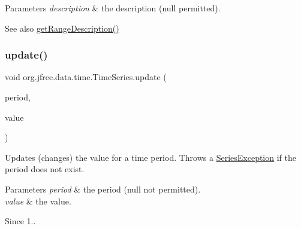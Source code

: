 \begin{DoxyParams}{Parameters}
{\em description} & the description ({\ttfamily null} permitted).\\
\hline
\end{DoxyParams}
\begin{DoxySeeAlso}{See also}
\mbox{\hyperlink{classorg_1_1jfree_1_1data_1_1time_1_1_time_series_a9a904357e8aef246ccadba5165add5e1}{get\+Range\+Description()}} 
\end{DoxySeeAlso}
\mbox{\label{classorg_1_1jfree_1_1data_1_1time_1_1_time_series_a0aec4775d79a7a21b0fd506041541c67}} 
\subsubsection{\texorpdfstring{update()}{update()}\hspace{0.1cm}{\footnotesize\ttfamily [1/3]}}
{\footnotesize\ttfamily void org.\+jfree.\+data.\+time.\+Time\+Series.\+update (\begin{DoxyParamCaption}\item[{\mbox{\hyperlink{classorg_1_1jfree_1_1data_1_1time_1_1_regular_time_period}{Regular\+Time\+Period}}}]{period,  }\item[{double}]{value }\end{DoxyParamCaption})}

Updates (changes) the value for a time period. Throws a \mbox{\hyperlink{}{Series\+Exception}} if the period does not exist.


\begin{DoxyParams}{Parameters}
{\em period} & the period ({\ttfamily null} not permitted). \\
\hline
{\em value} & the value.\\
\hline
\end{DoxyParams}
\begin{DoxySince}{Since}
1.. 
\end{DoxySince}
\mbox{\label{classorg_1_1jfree_1_1data_1_1time_1_1_time_series_a2cadf5e397cd313b26ed26b1c7e0655d}} 
